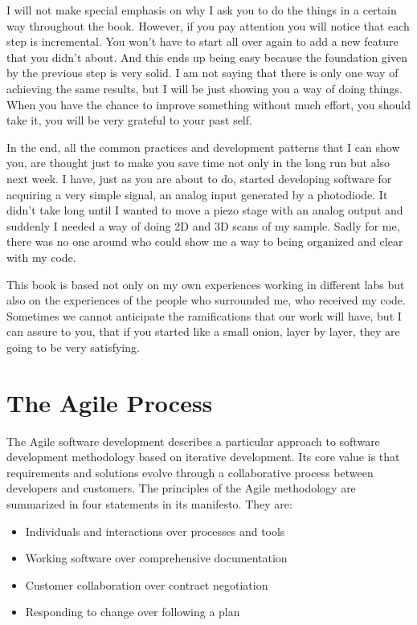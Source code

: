 I will not make special emphasis on why I ask you to do the things in a certain way throughout the book. However, if you pay attention you will notice that each step is incremental. You won’t have to start all over again to add a new feature that you didn’t about. And this ends up being easy because the foundation given by the previous step is very solid. I am not saying that there is only one way of achieving the same results, but I will be just showing you a way of doing things. When you have the chance to improve something without much effort, you should take it, you will be very grateful to your past self.

In the end, all the common practices and development patterns that I can show you, are thought just to make you save time not only in the long run but also next week. I have, just as you are about to do, started developing software for acquiring a very simple signal, an analog input generated by a photodiode. It didn’t take long until I wanted to move a piezo stage with an analog output and suddenly I needed a way of doing 2D and 3D scans of my sample. Sadly for me, there was no one around who could show me a way to being organized and clear with my code.

This book is based not only on my own experiences working in different labs but also on the experiences of the people who surrounded me, who received my code. Sometimes we cannot anticipate the ramifications that our work will have, but I can assure to you, that if you started like a small onion, layer by layer, they are going to be very satisfying.

\section{The Agile Process}
The Agile software development describes a particular approach to software development methodology based on iterative development. Its core value is that requirements and solutions evolve through a collaborative process between developers and customers. The principles of the Agile methodology are summarized in four statements in its manifesto. They are:

\begin{itemize}
 \item Individuals and interactions over processes and tools
 \item Working software over comprehensive documentation
 \item Customer collaboration over contract negotiation
 \item Responding to change over following a plan
\end{itemize}
        
